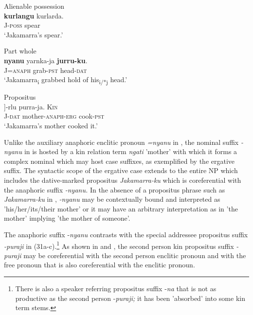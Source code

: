 \documentclass[output=paper]{../langscibook}
\begin{document}
\ea%

    \label{ex:laughren:30}

\ea
Alienable possession\\
\label{ex:laughren:30a}
\textbf{kurlangu} {kurlarda.}  \\
    J-\textsc{poss}  spear\\
\glt `Jakamarra's spear.'

\ex Part whole\\
\label{ex:laughren:30b}
\textbf{nyanu} {yarnka-ja} \textbf{{jurru-ku}}. \\
    J=\textsc{anaph}  grab-\textsc{pst}  head-\textsc{dat}\\
\glt `Jakamarra\textsubscript{i} grabbed hold of his\textsubscript{i/*j} head.'

\ex Propositus\\
\label{ex:laughren:30c}
\gll [Jakamarra\textsubscript{i}-kungati-[\textbf{nyanu}\textbf{\textsubscript{i}}\textsubscript{/*j}]]-{rlu}  {purra-ja}.  \textsc{Kin}\\
    J-\textsc{dat}  mother-\textsc{anaph-erg}  cook-\textsc{pst}\\
\glt `Jakamarra's mother cooked it.'
\z
\z

Unlike the auxiliary anaphoric enclitic pronoun \textit{=nyanu} in , the nominal suffix \textit{{}-nyanu} in  is hosted by a kin relation term \textit{ngati} 'mother' with which it forms a complex nominal which may host case suffixes, as exemplified by the ergative suffix. The syntactic scope of the ergative case extends to the entire NP which includes the dative-marked propositus \textit{Jakamarra-ku} which is coreferential with the anaphoric suffix \textit{{}-nyanu.} In the absence of a propositus phrase such as \textit{Jakamarra-ku} in , \textit{{}-nyanu} may be contextually bound and interpreted as 'his/her/its/their mother' or it may have an arbitrary interpretation as in 'the mother' implying 'the mother of someone'.

The anaphoric suffix -\textit{nyanu} contrasts with the special addressee propositus suffix \textit{\nobreakdash-puraji} in (31a-c).\footnote{There is also a speaker referring propositus suffix \nobreakdash-\textit{na} that is not as productive as the second person \nobreakdash-\textit{puraji;} it has been 'absorbed' into some kin term stems.} As shown in  and , the second person kin propositus suffix \textit{{}-puraji} may be coreferential with the second person enclitic pronoun and with the free pronoun that is also coreferential with the enclitic pronoun.
\end{document}
